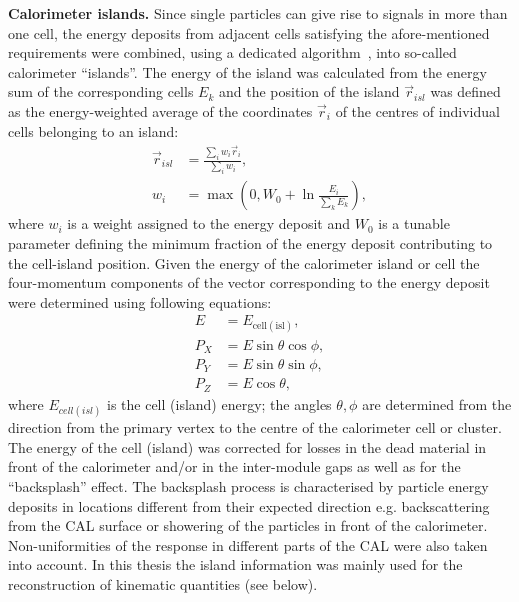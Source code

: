 \textbf{Calorimeter islands.}
Since single particles can give rise to signals in more than one cell, the energy deposits from adjacent cells satisfying the afore-men\-tio\-ned requirements were combined, using a dedicated algorithm~\cite{upub:grosse-knetter:zn9739}, into so-called calorimeter ``islands''. The energy of the island was calculated from the energy sum of the corresponding cells $E_k$ and the position of the island $\vec{r}_{isl}$ was defined as the energy-weighted average of the coordinates $\vec{r}_i$ of the centres of individual cells belonging to an island:
\begin{align}
\vec{r}_{isl} &= \frac{\sum_i{w_i \vec{r}_i}}{\sum_i{w_i}}, \\
w_i &= \max\left(0,W_0+\ln{\frac{E_i}{\sum_k{E_k}}}\right),
\end{align}
where $w_i$ is a weight assigned to the energy deposit and $W_0$ is a tunable parameter defining the minimum fraction of the energy deposit contributing to the cell-island position. Given the energy of the calorimeter island or cell the four-momentum components of the vector corresponding to the energy deposit were determined using following equations:
\begin{align}
	E    &= E_\mathrm{cell (isl)}, \\
	P_X &= E \sin{\theta}\cos{\phi}, \\
	P_Y &= E \sin{\theta}\sin{\phi}, \\
	P_Z &= E \cos{\theta},
\end{align}
where $E_{cell \left( isl \right)}$ is the cell (island) energy; the angles $\theta, \phi$ are determined from the direction from the primary vertex to the centre of the calorimeter cell or cluster. The energy of the cell (island) was corrected for losses in the dead material in front of the calorimeter and/or in the inter-module gaps as well as for the ``backsplash'' effect. The backsplash process is characterised by particle energy deposits in locations different from their expected direction e.g. backscattering from the CAL surface or showering of the particles in front of the calorimeter. Non-uniformities of the response in different parts of the CAL were also taken into account. In this thesis the island information was mainly used for the reconstruction of kinematic quantities (see below).